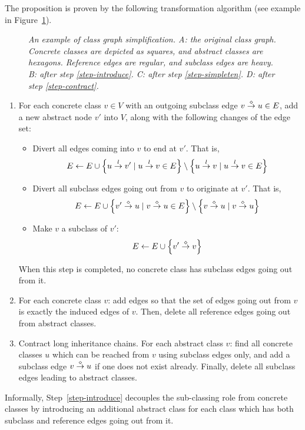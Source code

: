 \noindent The proposition is proven by the following transformation
algorithm (see example in Figure~\ref{fig-simplify}).
\begin{figure}
\centerline{}
\caption{\em
An example of class graph simplification. {\sf A}: the original class
graph.  Concrete classes are depicted as squares, and abstract classes
are hexagons.  Reference edges are regular, and subclass edges are
heavy.  {\sf B}: after step \protect\ref{step-introduce}.  {\sf C}:
after step \protect\ref{step-simpleten}.  {\sf D}: after step
\protect\ref{step-contract}.  }
\label{fig-simplify}
\end{figure}
\begin{enumerate}
\item
\label{step-introduce}
For each concrete class $v\in V$ with an outgoing subclass edge $v\stackrel{\diamond}{\rightarrow}u\in E$, add a new abstract node $v'$ into $V$, along with
the following changes of the edge set:
\begin{itemize}
\item
Divert all edges coming into $v$ to end at $v'$. That is, 
$$
E\gets E\cup\left\{ u\stackrel{l}{\rightarrow}v'\mid u\stackrel{l}{\rightarrow}v\in E \right\}
 \setminus\left\{ u\stackrel{l}{\rightarrow}v\mid  u\stackrel{l}{\rightarrow}v\in E \right\}
$$
\item
Divert all subclass edges going out from $v$ to originate at $v'$. That is,
$$
E\gets E\cup\left\{ v'\stackrel{\diamond}{\rightarrow}u\mid v\stackrel{\diamond}{\rightarrow}u\in E \right\}
   \setminus\left\{ v\stackrel{\diamond}{\rightarrow}u\mid v\stackrel{\diamond}{\rightarrow}u \right\}
$$
\item
Make $v$ a subclass of $v'$:
$$E\gets E\cup\left\{ v'\stackrel{\diamond}{\rightarrow}v \right\}$$
\end{itemize}
When this step is completed, no concrete class has subclass edges going 
out from it.

\item
\label{step-simpleten}
For each concrete class $v$: add edges so that the set of edges going
out from $v$ is exactly the induced edges of $v$.  Then, delete all
reference edges going out from abstract classes.

\item
\label{step-contract}
Contract long inheritance chains.  For each abstract class $v$: find
all concrete classes $u$ which can be reached from $v$ using subclass
edges only, and add a subclass edge $v\stackrel{\diamond}{\rightarrow}u$ if one does
not exist already. Finally, delete all subclass edges leading to
abstract classes.
\end{enumerate}

Informally, Step~\ref{step-introduce} decouples the sub-classing role
from concrete classes by introducing an additional abstract class for
each class which has both subclass and reference edges going out from
it.

